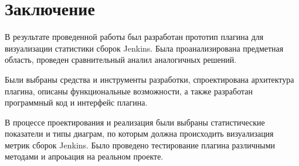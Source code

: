 \chapter*{Заключение} \label{ch-conclusion}

В результате проведенной работы был разработан прототип плагина для визуализации статистики сборок Jenkins. Была проанализирована предметная область, проведен сравнительный аналил аналогичных решений.

Были выбраны средства и инструменты разработки, спроектирована архитектура плагина, описаны функциональные возможности, а также разработан программный код и интерфейс плагина.

В процессе проектирования и реализация были выбраны статистические показатели и типы диаграм, по которым должна происходить визуализация метрик сборок Jenkins. Было проведено тестирование плагина различными методами и апроьация на реальном проекте.